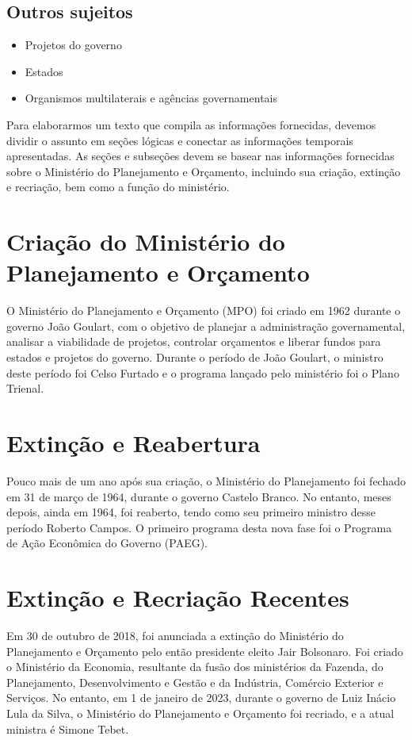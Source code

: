 \documentclass[
   article,       
   12pt,          
   oneside,       
   a4paper,       
   english,       
   brazil,        
   sumario=tradicional
   ]{abntex2}
\begin{document}
\subsection{Outros sujeitos}
\begin{itemize}
    \item Projetos do governo
    \item Estados
    \item Organismos multilaterais e agências governamentais
\end{itemize}
Para elaborarmos um texto que compila as informações fornecidas, devemos dividir o assunto em seções lógicas e conectar as informações temporais apresentadas. As seções e subseções devem se basear nas informações fornecidas sobre o Ministério do Planejamento e Orçamento, incluindo sua criação, extinção e recriação, bem como a função do ministério.

\section{Criação do Ministério do Planejamento e Orçamento}

O Ministério do Planejamento e Orçamento (MPO) foi criado em 1962 durante o governo João Goulart, com o objetivo de planejar a administração governamental, analisar a viabilidade de projetos, controlar orçamentos e liberar fundos para estados e projetos do governo. Durante o período de João Goulart, o ministro deste período foi Celso Furtado e o programa lançado pelo ministério foi o Plano Trienal.

\section{Extinção e Reabertura}

Pouco mais de um ano após sua criação, o Ministério do Planejamento foi fechado em 31 de março de 1964, durante o governo Castelo Branco. No entanto, meses depois, ainda em 1964, foi reaberto, tendo como seu primeiro ministro desse período Roberto Campos. O primeiro programa desta nova fase foi o Programa de Ação Econômica do Governo (PAEG).

\section{Extinção e Recriação Recentes}

Em 30 de outubro de 2018, foi anunciada a extinção do Ministério do Planejamento e Orçamento pelo então presidente eleito Jair Bolsonaro. Foi criado o Ministério da Economia, resultante da fusão dos ministérios da Fazenda, do Planejamento, Desenvolvimento e Gestão e da Indústria, Comércio Exterior e Serviços. No entanto, em 1 de janeiro de 2023, durante o governo de Luiz Inácio Lula da Silva, o Ministério do Planejamento e Orçamento foi recriado, e a atual ministra é Simone Tebet.
\end{document}
